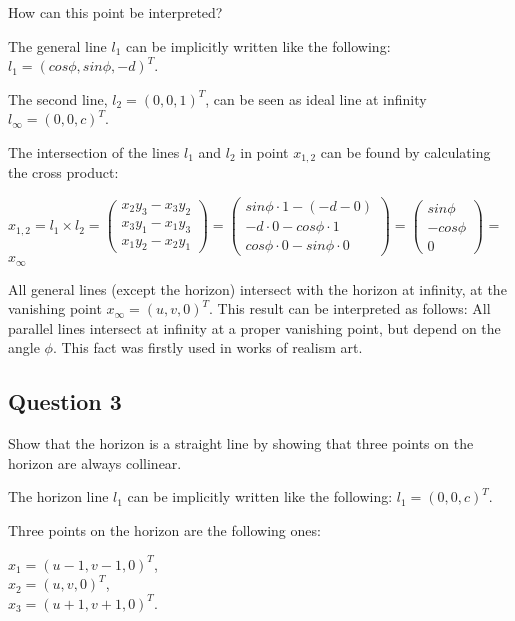 \documentclass[a4paper,headings=small]{scrartcl}
\numberwithin{equation}{section} %
\numberwithin{figure}{section}   %
\begin{document}
How can this point be interpreted?

The general line $l_1$ can be implicitly written like the following:
$l_1=(cos \phi, sin \phi, -d)^T$.

The second line, $l_{2}=(0, 0, 1)^T$, can be seen as ideal line at infinity $l_{\infty}=(0, 0, c)^T$.

The intersection of the lines $l_1$ and $l_2$ in point $x_{1,2}$ can be found by calculating the cross product:

$x_{1,2} = l_1 \times l_2 =
\left( \begin{array}{c}
x_2 y_3 - x_3 y_2\\
x_3 y_1 - x_1 y_3\\
x_1 y_2 - x_2 y_1\end{array} \right) =
\left( \begin{array}{c}
sin \phi \cdot 1 - (-d - 0)\\
-d \cdot 0 - cos \phi \cdot 1\\
cos \phi \cdot 0 - sin \phi \cdot 0\end{array} \right) =
\left( \begin{array}{c}
sin \phi\\
-cos \phi\\
0\end{array} \right)$ = $x_{\infty}$

All general lines (except the horizon) intersect with the horizon at infinity,
at the vanishing point $x_{\infty}=(u,v,0)^T$.
This result can be interpreted as follows:
All parallel lines intersect at infinity at a proper vanishing point, 
but depend on the angle $\phi$.
This fact was firstly used in works of realism art.

\subsection{Question 3}

Show that the horizon is a straight line by showing that three points
on the horizon are always collinear.

The horizon line $l_1$ can be implicitly written like the following: $l_1=(0, 0, c)^T$.

Three points on the horizon are the following ones:

$x_{1} = (u - 1, v - 1, 0)^T$, \\
$x_{2} = (u, v, 0)^T$, \\
$x_{3} = (u + 1, v + 1, 0)^T$. \\
\end{document}
